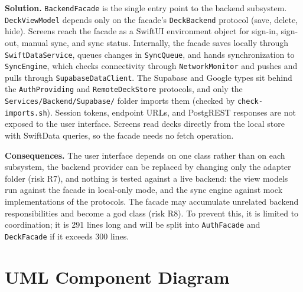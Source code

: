 \documentclass[12pt,letterpaper]{article}
\begin{document}
\textbf{Solution.} \texttt{BackendFacade} is the single entry point to the backend
subsystem. \texttt{DeckViewModel} depends only on the facade's \texttt{DeckBackend}
protocol (save, delete, hide). Screens reach the facade as a SwiftUI environment object
for sign-in, sign-out, manual sync, and sync status. Internally, the facade saves
locally through \texttt{SwiftDataService}, queues changes in \texttt{SyncQueue}, and
hands synchronization to \texttt{SyncEngine}, which checks connectivity through
\texttt{NetworkMonitor} and pushes and pulls through \texttt{SupabaseDataClient}. The
Supabase and Google types sit behind the \texttt{AuthProviding} and
\texttt{RemoteDeckStore} protocols, and only the \texttt{Services/\allowbreak Backend/\allowbreak Supabase/}
folder imports them (checked by \texttt{check-imports.sh}). Session tokens, endpoint
URLs, and PostgREST responses are not exposed to the user interface. Screens read decks
directly from the local store with SwiftData queries, so the facade needs no fetch
operation.

\textbf{Consequences.} The user interface depends on one class rather than on each
subsystem, the backend provider can be replaced by changing only the adapter folder
(risk R7), and nothing is tested against a live backend: the view models run against
the facade in local-only mode, and the sync engine against mock implementations of the
protocols. The facade may accumulate unrelated backend
responsibilities and become a god class (risk R8). To prevent this, it is limited to
coordination; it is 291 lines long and will be split into \texttt{AuthFacade} and
\texttt{DeckFacade} if it exceeds 300 lines.

\section{UML Component Diagram}\label{sec:component}
\end{document}
